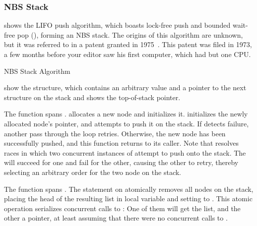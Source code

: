 \subsubsection{NBS Stack}
\label{sec:advsync:NBS Stack}

\begin{fcvref}
shows the LIFO push algorithm, which boasts lock-free push and
bounded wait-free pop (), forming an NBS stack.
The origins of this algorithm are unknown, but it was referred to in
a patent granted in 1975~\cite{PaulJBrown1975LIFOpush}.
This patent was filed in 1973, a few months before your editor
saw his first computer, which had but one CPU\@.

\begin{listing}

\caption{NBS Stack Algorithm}
\label{lst:advsync:NBS Stack Algorithm}
\end{listing}

 show the  structure,
which contains an arbitrary value and a pointer to the next structure
on the stack and
 shows the top-of-stack pointer.

The  function spans .
 allocates a new node and
 initializes it.
 initializes the newly allocated node's 
pointer, and  attempts to push it on the stack.
If  detects  failure, another pass
through the loop retries.
Otherwise, the new node has been successfully pushed, and this function
returns to its caller.
Note that  resolves races in which two concurrent
instances of  attempt to push onto the stack.
The  will succeed for one and fail for the other,
causing the other to retry, thereby selecting an arbitrary order for
the two node on the stack.

The  function spans .
The  statement on  atomically removes
all nodes on the stack, placing the head of the resulting list in local
variable  and setting  to .
This atomic operation serializes concurrent calls to :
One of them will get the list, and the other a  pointer, at
least assuming that there were no concurrent calls to .


\end{fcvref}
